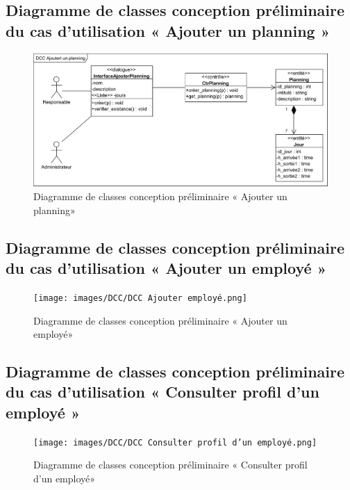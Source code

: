         \subsection*{Diagramme de classes conception préliminaire du cas d'utilisation « Ajouter un planning »}
        \begin{figure}[h!]
                 \centering
                \includegraphics[scale=0.7]{images/DCC/DCC Ajoutert un planning.png}
                 \caption{Diagramme de classes conception préliminaire « Ajouter un planning»}
                 \label{fig44}
        \end{figure}
        
        \clearpage



        \subsection*{Diagramme de classes conception préliminaire du cas d'utilisation « Ajouter un employé »}
        \begin{figure}[h!]
                 \centering
                \texttt{[image: images/DCC/DCC Ajouter employé.png]}
                 \caption{Diagramme de classes conception préliminaire « Ajouter un employé»}
                 \label{fig45}
        \end{figure}



        \subsection*{Diagramme de classes conception préliminaire du cas d'utilisation « Consulter profil d'un employé »}

        \begin{figure}[h!]
                 \centering
                \texttt{[image: images/DCC/DCC Consulter profil d'un employé.png]}
                 \caption{Diagramme de classes conception préliminaire « Consulter profil d'un employé»}
                 \label{fig46}
        \end{figure}

